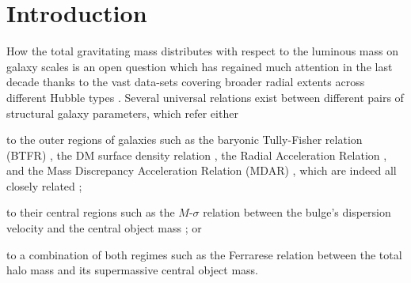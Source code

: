 \section{Introduction}

How the total gravitating mass distributes with respect to the luminous mass on galaxy scales is an open question which has regained much attention in the last decade thanks to the vast data-sets covering broader radial extents across different Hubble types \citep{2008AJ....136.2648D,2011MNRAS.413..813C,2016AJ....152..157L}.
Several universal relations exist between different pairs of structural galaxy parameters, which refer either \begin{inparaenum}[(i)]
    \item to the outer regions of galaxies such as the baryonic Tully-Fisher relation (BTFR) \citep{2000ApJ...533L..99M}, the DM surface density relation \citep{2009MNRAS.397.1169D}, the Radial Acceleration Relation \citep{2016PhRvL.117t1101M}, and the Mass Discrepancy Acceleration Relation (MDAR) \citep{2004ApJ...609..652M}, which are indeed all closely related \citep{2004ApJ...609..652M,2016arXiv161208857S,2018FoPh...48.1517S}; 
    \item to their central regions such as the $M$-$\sigma$ relation between the bulge's dispersion velocity and the central object mass \citep{2000ApJ...539L...9F}; or
    \item to a combination of both regimes such as the Ferrarese relation \citep{2002ApJ...578...90F,2011Natur.469..377K,2015ApJ...800..124B} between the total halo mass and its supermassive central object mass.
\end{inparaenum}


